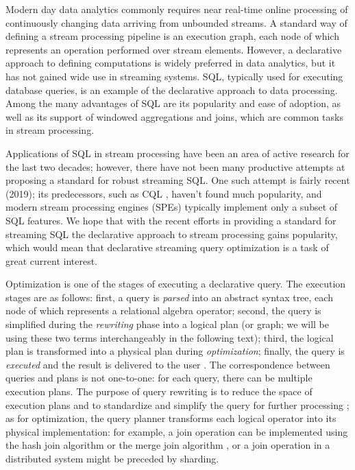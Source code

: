\label {fs-optimization-introduction}

Modern day data analytics commonly requires near real-time online processing of continuously changing data arriving from unbounded streams. A standard way of defining a stream processing pipeline is an execution graph, each node of which represents an operation performed over stream elements. However, a declarative approach to defining computations is widely preferred in data analytics, but it has not gained wide use in streaming systems. SQL, typically used for executing database queries, is an example of the declarative approach to data processing. Among the many advantages of SQL are its popularity and ease of adoption, as well as its support of windowed aggregations and joins, which are common tasks in stream processing. 

Applications of SQL in stream processing have been an area of active research for the last two decades; however, there have not been many productive attempts at proposing a standard for robust streaming SQL. One such attempt \cite{Begoli:2019:OSR:3299869.3314040} is fairly recent (2019); its predecessors, such as CQL \cite{Arasu:2006:CCQ:1146461.1146463}, haven't found much popularity, and modern stream processing engines (SPEs) typically implement only a subset of SQL features. We hope that with the recent efforts in providing a standard for streaming SQL the declarative approach to stream processing gains popularity, which would mean that declarative streaming query optimization is a task of great current interest.

Optimization is one of the stages of executing a declarative query. The execution stages are as follows: first, a query is \textit{parsed} into an abstract syntax tree, each node of which represents a relational algebra operator; second, the query is simplified during the \textit{rewriting} phase into a logical plan (or graph; we will be using these two terms interchangeably in the following text); third, the logical plan is transformed into a physical plan during \textit{optimization}; finally, the query is \textit{executed} and the result is delivered to the user \cite{Pitoura2018processing}. The correspondence between queries and plans is not one-to-one: for each query, there can be multiple execution plans. The purpose of query rewriting is to reduce the space of execution plans and to standardize and simplify the query for further processing \cite{Pitoura2018rewriting}; as for optimization, the query planner transforms each logical operator into its physical implementation: for example, a join operation can be implemented using the hash join algorithm or the merge join algorithm \cite{Neumann2018optimization}, or a join operation in a distributed system might be preceded by sharding.  

